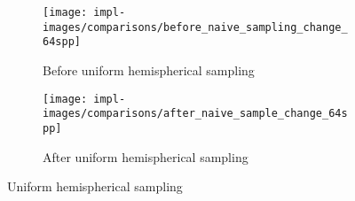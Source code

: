 \vspace{0.3em}
\begin{figure}[htb]
  \centering
  \begin{subfigure}[htb]{\textwidth}
    \texttt{[image: impl-images/comparisons/before\_naive\_sampling\_change\_64spp]}
    \caption{Before uniform hemispherical sampling}
    \label{fig:rayterm-gpu_hemispherical_sampling_before_large}
  \end{subfigure}
  \begin{subfigure}[htb]{\textwidth}
    \texttt{[image: impl-images/comparisons/after\_naive\_sample\_change\_64spp]}
    \caption{After uniform hemispherical sampling}
    \label{fig:rayterm-gpu_hemispherical_sampling_after_large}
  \end{subfigure}
  \caption{Uniform hemispherical sampling}
  \label{fig:rayterm-gpu_hemispherical_sampling_large}
\end{figure}

